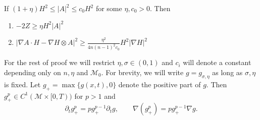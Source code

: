 \begin{comment}
    Also, \begin{align*}
        \nabla g & = \nabla \left[ (|A|^{2}- (1+\eta)H^{2})H^{\sigma -2}\right] \\
        & = (\nabla|A|^{2}- 2(1+\eta)H\nabla H)H^{\sigma -2} + (\sigma -2)(|A|^{2}- (1+\eta)H^{2})H^{\sigma -3}\nabla H \\
        & = (\nabla|A|^{2})H^{\sigma -2} + (\sigma -2)|A|^{2}H^{\sigma -3}\nabla H - \sigma(1+\eta)H^{\sigma -1}\nabla H
    \end{align*}
    which implies \begin{align*}
        \left< \nabla H, \nabla g \right>& = \left< \nabla |A|^{2}, \nabla H \right>H^{\sigma -2} + (\sigma -2)|A|^{2}|\nabla H|^{2}H^{\sigma -3} - \sigma (1+ \eta)|\nabla H|^{2}H^{\sigma -1}
    \end{align*}
\end{proof}
\end{comment}


 

    

\begin{lemma}\cite{huisken1999mean} \label{tensored}
    If $ (1+\eta)H^{2} \le |A|^{2} \le c_{0}H^{2} $ for some $ \eta, c_{0} >0 $. Then 
    \begin{enumerate}
        \item $ -2Z \ge \eta H^{2}|A|^{2} $
        \item $ |\nabla A \cdot H - \nabla H \otimes A|^{2} \ge \frac{\eta^{2}}{4n(n-1)^{2}c_{0}}H^{2}|\nabla H|^{2} $
    \end{enumerate}
\end{lemma}

For the rest of proof we will restrict $ \eta, \sigma \in (0,1) $ and $ c_{i} $ will denote a constant depending only on $ n, \eta $ and $ \mathcal{M}_{0} $. For brevity, we will write $ g = g_{\sigma,\eta} $ as long as $ \sigma, \eta $ is fixed. Let $ g_{+}= \max\{g(x,t),0\} $ denote the positive part of $ g $. Then $ g_{+}^{p} \in C^{1}( \mathcal{M} \times [0,T)) $ for $ p>1 $ and 
\[ \partial_{t}g_{+}^{p} = pg_{+}^{p-1}\partial_{t}g, \qquad \nabla (g_{+}^{p}) =p g_{+}^{p-1}\nabla g. \]

